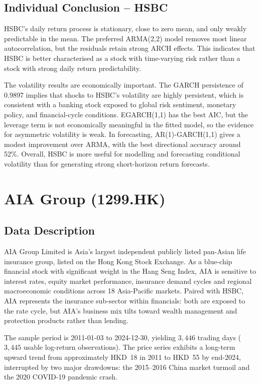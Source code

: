 \documentclass[11pt,a4paper]{article}
\begin{document}
\subsection{Individual Conclusion -- HSBC}
HSBC's daily return process is stationary, close to zero mean, and only weakly predictable in the mean. The preferred ARMA(2,2) model removes most linear autocorrelation, but the residuals retain strong ARCH effects. This indicates that HSBC is better characterised as a stock with time-varying risk rather than a stock with strong daily return predictability.

The volatility results are economically important. The GARCH persistence of 0.9897 implies that shocks to HSBC's volatility are highly persistent, which is consistent with a banking stock exposed to global risk sentiment, monetary policy, and financial-cycle conditions. EGARCH(1,1) has the best AIC, but the leverage term is not economically meaningful in the fitted model, so the evidence for asymmetric volatility is weak. In forecasting, AR(1)-GARCH(1,1) gives a modest improvement over ARMA, with the best directional accuracy around 52\%. Overall, HSBC is more useful for modelling and forecasting conditional volatility than for generating strong short-horizon return forecasts.

\section{AIA Group (1299.HK)}
\label{sec:aia}

\subsection{Data Description}
AIA Group Limited is Asia's largest independent publicly listed pan-Asian
life insurance group, listed on the Hong Kong Stock Exchange.  As a
blue-chip financial stock with significant weight in the Hang Seng Index,
AIA is sensitive to interest rates, equity market performance, insurance
demand cycles and regional macroeconomic conditions across 18
Asia-Pacific markets.  Paired with HSBC, AIA represents the insurance
sub-sector within financials: both are exposed to the rate cycle, but
AIA's business mix tilts toward wealth management and protection products
rather than lending.

The sample period is 2011-01-03 to 2024-12-30, yielding $3{,}446$ trading
days ($3{,}445$ usable log-return observations).  The price series
exhibits a long-term upward trend from approximately HKD~18 in 2011 to
HKD~55 by end-2024, interrupted by two major drawdowns: the 2015--2016
China market turmoil and the 2020 COVID-19 pandemic crash.
\end{document}
